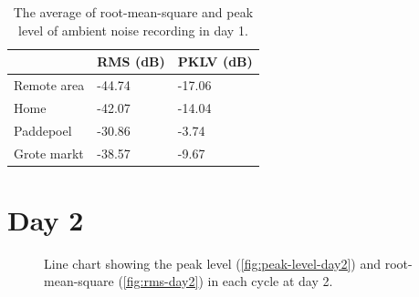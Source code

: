 \begin{table}[H]
\centering
\caption{The average of root-mean-square and peak level of ambient noise recording in day 1.}
\label{tab:ambient-noise-average-day1}
\begin{tabular}{lll} \toprule
            & \ac{RMS} (dB) & \ac{PKLV} (dB) \\ \midrule
Remote area & -44.74                & -17.06          \\
Home        & -42.07                & -14.04           \\
Paddepoel   & -30.86                & -3.74          \\
Grote markt & -38.57              & -9.67        \\ \bottomrule
\end{tabular}
\end{table}




\section{Day 2} %
\label{sec:ambient-noise-day_2}
\begin{figure}[H]
	\begin{adjustwidth}{-3cm}{}
	\centering
	\end{adjustwidth}
	\caption{Line chart showing the peak level (\ref{fig:peak-level-day2}) and root-mean-square (\ref{fig:rms-day2}) in each cycle at day 2.}
	\label{fig:audio-result-day2}
\end{figure}

